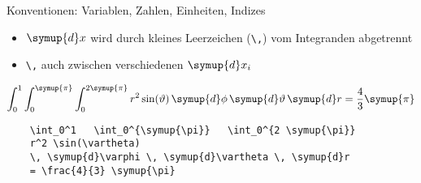 \begin{frame}[fragile]{Konventionen: Variablen, Zahlen, Einheiten, Indizes}
  \begin{itemize}
    \item $\symup{d}x$ wird durch kleines Leerzeichen (\verb+\,+) vom Integranden abgetrennt
    \item \verb+\,+ auch zwischen verschiedenen $\symup{d}x_i$
  \end{itemize}

  \begin{equation*}
    \int_0^1 \int_0^{\symup{\pi}} \int_0^{2 \symup{\pi}}
    r^2 \sin(\vartheta) \,
    \symup{d}\phi \, \symup{d}\vartheta \, \symup{d}r
    = \frac{4}{3} \symup{\pi}
  \end{equation*}

  \vspace{1em}
  \begin{lstlisting}
    \int_0^1   \int_0^{\symup{\pi}}   \int_0^{2 \symup{\pi}}
    r^2 \sin(\vartheta)
    \, \symup{d}\varphi \, \symup{d}\vartheta \, \symup{d}r
    = \frac{4}{3} \symup{\pi}
  \end{lstlisting}
\end{frame}

